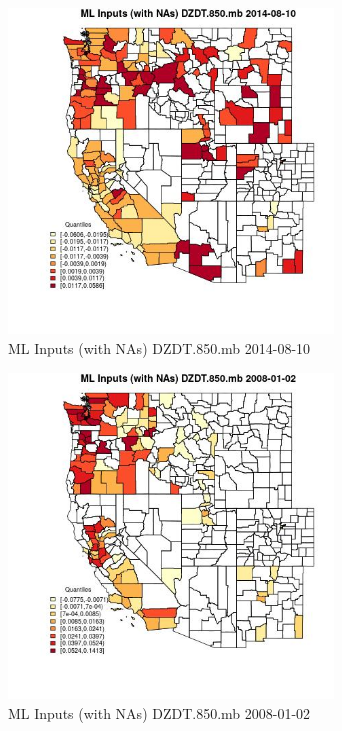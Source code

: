 \begin{figure} 
\centering  
\includegraphics[width=0.77\textwidth]{Code_Outputs/Report_ML_input_PM25_Step4_part_e_de_duplicated_aves_compiled_2019-05-18wNAs_CountyDZDT850mbMean2014-08-10_2014-08-10.jpg} 
\caption{\label{fig:Report_ML_input_PM25_Step4_part_e_de_duplicated_aves_compiled_2019-05-18wNAsCountyDZDT850mbMean2014-08-10_2014-08-10}ML Inputs (with NAs) DZDT.850.mb 2014-08-10} 
\end{figure} 
 

\begin{figure} 
\centering  
\includegraphics[width=0.77\textwidth]{Code_Outputs/Report_ML_input_PM25_Step4_part_e_de_duplicated_aves_compiled_2019-05-18wNAs_CountyDZDT850mbMean2008-01-02_2008-01-02.jpg} 
\caption{\label{fig:Report_ML_input_PM25_Step4_part_e_de_duplicated_aves_compiled_2019-05-18wNAsCountyDZDT850mbMean2008-01-02_2008-01-02}ML Inputs (with NAs) DZDT.850.mb 2008-01-02} 
\end{figure} 
 

